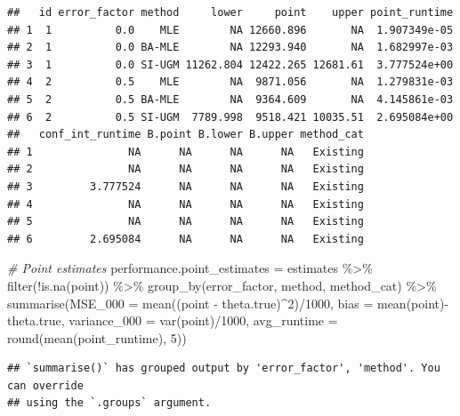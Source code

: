 \documentclass[
]{article}
\newenvironment{Shaded}{\begin{snugshade}}{\end{snugshade}}
\newcommand{\AttributeTok}[1]{\textcolor[rgb]{0.77,0.63,0.00}{#1}}
\newcommand{\CommentTok}[1]{\textcolor[rgb]{0.56,0.35,0.01}{\textit{#1}}}
\newcommand{\DecValTok}[1]{\textcolor[rgb]{0.00,0.00,0.81}{#1}}
\newcommand{\FunctionTok}[1]{\textcolor[rgb]{0.00,0.00,0.00}{#1}}
\newcommand{\NormalTok}[1]{#1}
\newcommand{\OtherTok}[1]{\textcolor[rgb]{0.56,0.35,0.01}{#1}}
\newcommand{\SpecialCharTok}[1]{\textcolor[rgb]{0.00,0.00,0.00}{#1}}
\begin{document}
\begin{verbatim}
##   id error_factor method     lower     point    upper point_runtime
## 1  1          0.0    MLE        NA 12660.896       NA  1.907349e-05
## 2  1          0.0 BA-MLE        NA 12293.940       NA  1.682997e-03
## 3  1          0.0 SI-UGM 11262.804 12422.265 12681.61  3.777524e+00
## 4  2          0.5    MLE        NA  9871.056       NA  1.279831e-03
## 5  2          0.5 BA-MLE        NA  9364.609       NA  4.145861e-03
## 6  2          0.5 SI-UGM  7789.998  9518.421 10035.51  2.695084e+00
##   conf_int_runtime B.point B.lower B.upper method_cat
## 1               NA      NA      NA      NA   Existing
## 2               NA      NA      NA      NA   Existing
## 3         3.777524      NA      NA      NA   Existing
## 4               NA      NA      NA      NA   Existing
## 5               NA      NA      NA      NA   Existing
## 6         2.695084      NA      NA      NA   Existing
\end{verbatim}

\begin{Shaded}
\begin{Highlighting}[]
\CommentTok{\# Point estimates}
\NormalTok{performance.point\_estimates }\OtherTok{=}\NormalTok{ estimates }\SpecialCharTok{\%\textgreater{}\%}
  \FunctionTok{filter}\NormalTok{(}\SpecialCharTok{!}\FunctionTok{is.na}\NormalTok{(point)) }\SpecialCharTok{\%\textgreater{}\%}
  \FunctionTok{group\_by}\NormalTok{(error\_factor, method, method\_cat) }\SpecialCharTok{\%\textgreater{}\%}
  \FunctionTok{summarise}\NormalTok{(}\AttributeTok{MSE\_000 =} \FunctionTok{mean}\NormalTok{((point }\SpecialCharTok{{-}}\NormalTok{ theta.true)}\SpecialCharTok{\^{}}\DecValTok{2}\NormalTok{)}\SpecialCharTok{/}\DecValTok{1000}\NormalTok{,}
            \AttributeTok{bias =} \FunctionTok{mean}\NormalTok{(point)}\SpecialCharTok{{-}}\NormalTok{theta.true,}
            \AttributeTok{variance\_000 =} \FunctionTok{var}\NormalTok{(point)}\SpecialCharTok{/}\DecValTok{1000}\NormalTok{,}
            \AttributeTok{avg\_runtime =} \FunctionTok{round}\NormalTok{(}\FunctionTok{mean}\NormalTok{(point\_runtime), }\DecValTok{5}\NormalTok{))}
\end{Highlighting}
\end{Shaded}

\begin{verbatim}
## `summarise()` has grouped output by 'error_factor', 'method'. You can override
## using the `.groups` argument.
\end{verbatim}
\end{document}
